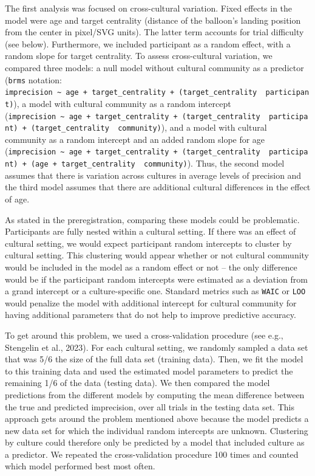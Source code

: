 \documentclass[
  man,floatsintext]{apa7}
\begin{document}
The first analysis was focused on cross-cultural variation. Fixed effects in the model were age and target centrality (distance of the balloon's landing position from the center in pixel/SVG units). The latter term accounts for trial difficulty (see below). Furthermore, we included participant as a random effect, with a random slope for target centrality. To assess cross-cultural variation, we compared three models: a null model without cultural community as a predictor (\texttt{brms} notation: \texttt{imprecision\ \textasciitilde{}\ age\ +\ target\_centrality\ +\ (target\_centrality\ \textbar{}\ participant)}), a model with cultural community as a random intercept (\texttt{imprecision\ \textasciitilde{}\ age\ +\ target\_centrality\ +\ (target\_centrality\ \textbar{}\ participant)\ +\ (target\_centrality\ \textbar{}\ community)}), and a model with cultural community as a random intercept and an added random slope for age (\texttt{imprecision\ \textasciitilde{}\ age\ +\ target\_centrality\ +\ (target\_centrality\ \textbar{}\ participant)\ +\ (age\ +\ target\_centrality\ \textbar{}\ community)}). Thus, the second model assumes that there is variation across cultures in average levels of precision and the third model assumes that there are additional cultural differences in the effect of age.

As stated in the preregistration, comparing these models could be problematic. Participants are fully nested within a cultural setting. If there was an effect of cultural setting, we would expect participant random intercepts to cluster by cultural setting. This clustering would appear whether or not cultural community would be included in the model as a random effect or not -- the only difference would be if the participant random intercepts were estimated as a deviation from a grand intercept or a culture-specific one. Standard metrics such as \texttt{WAIC} or \texttt{LOO} would penalize the model with additional intercept for cultural community for having additional parameters that do not help to improve predictive accuracy.

To get around this problem, we used a cross-validation procedure (see e.g., Stengelin et al., 2023). For each cultural setting, we randomly sampled a data set that was 5/6 the size of the full data set (training data). Then, we fit the model to this training data and used the estimated model parameters to predict the remaining 1/6 of the data (testing data). We then compared the model predictions from the different models by computing the mean difference between the true and predicted imprecision, over all trials in the testing data set. This approach gets around the problem mentioned above because the model predicts a new data set for which the individual random intercepts are unknown. Clustering by culture could therefore only be predicted by a model that included culture as a predictor. We repeated the cross-validation procedure 100 times and counted which model performed best most often.
\end{document}
